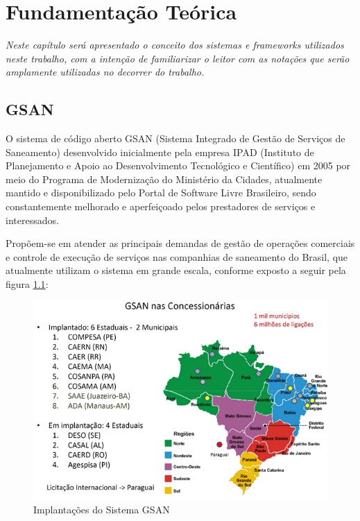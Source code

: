 \chapter[Fundamentação Teórica]{\textbf{F}undamentação \textbf{T}eórica}


\textit{Neste capítulo será apresentado o conceito dos sistemas e \textit{frameworks} utilizados neste trabalho, com a intenção de familiarizar o leitor com as notações que serão amplamente utilizadas no decorrer do trabalho.}

\section{GSAN}
O sistema de código aberto GSAN\label{key:GSAN-TEORIA} (Sistema Integrado de Gestão de Serviços de Saneamento) desenvolvido inicialmente pela empresa IPAD (Instituto de Planejamento e Apoio ao Desenvolvimento Tecnológico e Científico) em 2005 por meio do Programa de Modernização do Ministério da Cidades, atualmente mantido e disponibilizado pelo Portal de Software Livre Brasileiro, sendo constantemente melhorado e aperfeiçoado pelos prestadores de serviços e interessados. 

Propõem-se em atender as principais demandas de gestão de operações comerciais e controle de execução de serviços nas companhias de saneamento do Brasil, que atualmente utilizam o sistema em grande escala, conforme exposto a seguir pela figura \ref{figura:implantacaoSistemaGSAN}:


\begin{figure}[H]
	\centering
	\caption{Implantações do Sistema GSAN}	
	\label{figura:implantacaoSistemaGSAN}
	\includegraphics{figuras/implantacaoGSAN.png}
\end{figure}


